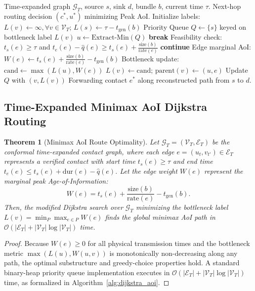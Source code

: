 \documentclass[preprint,12pt,5p,twocolumn]{elsarticle}
\newtheorem{theorem}{Theorem}
\begin{document}
\begin{algorithm}[t]
\caption{Time-Expanded Minimax AoI Dijkstra Route Search}
\label{alg:dijkstra_aoi}
\begin{algorithmic}[1]
\REQUIRE Time-expanded graph $\mathcal{G}_T$, source $s$, sink $d$, bundle $b$, current time $\tau$.
\ENSURE Next-hop routing decision $(c^*, u^*)$ minimizing Peak AoI.
\STATE Initialize labels: $L(v) \leftarrow \infty, \forall v \in \mathcal{V}_T$; $L(s) \leftarrow \tau - t_{\text{gen}}(b)$
\STATE Priority Queue $Q \leftarrow \{s\}$ keyed on bottleneck label $L(v)$
    \STATE $u \leftarrow \text{Extract-Min}(Q)$
     \STATE \textbf{break} \ENDIF
        \STATE Feasibility check: $t_s(e) \ge \tau$ and $t_e(e) - \hat{q}(e) \ge t_s(e) + \frac{\text{size}(b)}{\text{rate}(e)}$
         \STATE \textbf{continue} \ENDIF
        \STATE Edge marginal AoI: $W(e) \leftarrow t_s(e) + \frac{\text{size}(b)}{\text{rate}(e)} - t_{\text{gen}}(b)$
        \STATE Bottleneck update: $\text{cand} \leftarrow \max(L(u), W(e))$
            \STATE $L(v) \leftarrow \text{cand}$; $\text{parent}(v) \leftarrow (u, e)$
            \STATE Update $Q$ with $(v, L(v))$
        \ENDIF
    \ENDFOR
\ENDWHILE
\RETURN Forwarding contact $e^*$ along reconstructed path from $s$ to $d$.
\end{algorithmic}
\end{algorithm}

\subsection{Time-Expanded Minimax AoI Dijkstra Routing}
\begin{theorem}[Minimax AoI Route Optimality]
\label{thm:dijkstra}
Let $\mathcal{G}_T = (\mathcal{V}_T, \mathcal{E}_T)$ be the conformal time-expanded contact graph, where each edge $e = (u_t, v_{t'}) \in \mathcal{E}_T$ represents a verified contact with start time $t_s(e) \ge \tau$ and end time $t_e(e) \le t_s(e) + \text{dur}(e) - \hat{q}(e)$. Let the edge weight $W(e)$ represent the marginal peak Age-of-Information:
\begin{equation}
W(e) = t_s(e) + \frac{\text{size}(b)}{\text{rate}(e)} - t_{\text{gen}}(b).
\end{equation}
Then, the modified Dijkstra search over $\mathcal{G}_T$ minimizing the bottleneck label $L(v) = \min_{P} \max_{e \in P} W(e)$ finds the global minimax AoI path in $\mathcal{O}(|\mathcal{E}_T| + |\mathcal{V}_T| \log |\mathcal{V}_T|)$ time.
\end{theorem}
\begin{proof}
Because $W(e) \ge 0$ for all physical transmission times and the bottleneck metric $\max(L(u), W(u, v))$ is monotonically non-decreasing along any path, the optimal substructure and greedy-choice properties hold. A standard binary-heap priority queue implementation executes in $\mathcal{O}(|\mathcal{E}_T| + |\mathcal{V}_T| \log |\mathcal{V}_T|)$ time, as formalized in Algorithm~\ref{alg:dijkstra_aoi}.
\end{proof}
\end{document}
